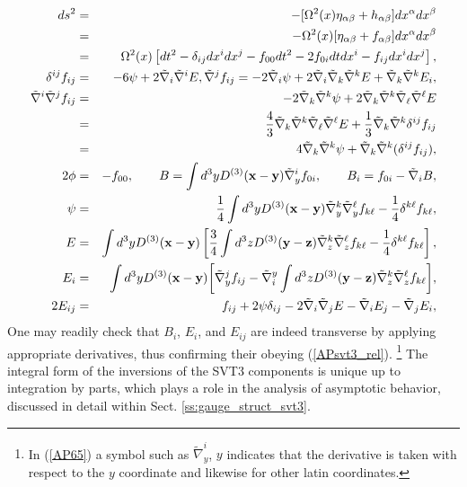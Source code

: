 \begin{eqnarray}
ds^2&=&-[\Omega^2(x)\eta_{\alpha\beta}+h_{\alpha\beta}]dx^{\alpha}dx^{\beta}
\nonumber\\
&=&-\Omega^2(x)[\eta_{\alpha\beta}+f_{\alpha\beta}]dx^{\alpha}dx^{\beta}
\nonumber\\
&=&\Omega^2(x)\left[dt^2-\delta_{ij}dx^idx^j-f_{00}dt^2-2f_{0i}dtdx^i-f_{ij}dx^idx^j\right],
\nonumber\\
\delta^{ij}f_{ij}&=&-6\psi+2\tilde{\nabla}_i\tilde{\nabla}^iE,
\tilde{\nabla}^jf_{ij}=-2\tilde{\nabla}_i\psi+2\tilde{\nabla}_i\tilde{\nabla}_k\tilde{\nabla}^kE+\tilde{\nabla}_k\tilde{\nabla}^kE_{i},
\nonumber\\
\tilde{\nabla}^i \tilde{\nabla}^jf_{ij}&=&-2\tilde{\nabla}_k\tilde{\nabla}^k\psi+2\tilde{\nabla}_k\tilde{\nabla}^k\tilde{\nabla}_{\ell}\tilde{\nabla}^{\ell}E
\nonumber\\
&=&\frac{4}{3}\tilde{\nabla}_k\tilde{\nabla}^k\tilde{\nabla}_{\ell}\tilde{\nabla}^{\ell}E+\frac{1}{3}\tilde{\nabla}_k\tilde{\nabla}^k\delta^{ij}f_{ij}
\nonumber\\
&=&4\tilde{\nabla}_k\tilde{\nabla}^k\psi+\tilde{\nabla}_k\tilde{\nabla}^k(\delta^{ij}f_{ij}),
\nonumber\\
2\phi&=&-f_{00},\qquad
B=\int d^3yD^{(3)}(\mathbf{x}-\mathbf{y})\tilde{\nabla}_y^if_{0i},\qquad B_i=f_{0i}-\tilde{\nabla}_iB,
\nonumber\\
\psi&=&\frac{1}{4}\int d^3yD^{(3)}(\mathbf{x}-\mathbf{y})\tilde{\nabla}_y^k\tilde{\nabla}_y^{\ell}f_{k\ell}-\frac{1}{4}\delta^{k\ell}f_{k\ell},
\nonumber\\
\qquad
E&=&\int d^3yD^{(3)}(\mathbf{x}-\mathbf{y})\left[\frac{3}{4}\int d^3zD^{(3)}(\mathbf{y}-\mathbf{z})\tilde{\nabla}_z^k\tilde{\nabla}_z^{\ell}f_{k\ell}-\frac{1}{4}\delta^{k\ell}f_{k\ell}\right],
\nonumber\\
E_i&=&\int d^3yD^{(3)}(\mathbf{x}-\mathbf{y})\bigg{[}\tilde{\nabla}_y^jf_{ij}
-\tilde{\nabla}^y_i\int d^3zD^{(3)}(\mathbf{y}-\mathbf{z})\tilde{\nabla}_z^k\tilde{\nabla}_z^{\ell}f_{k\ell}\bigg{]},
\nonumber\\
2E_{ij}&=&f_{ij}+2\psi\delta_{ij} -2\tilde{\nabla}_i\tilde{\nabla}_j E - \tilde{\nabla}_i E_j - \tilde{\nabla}_j E_i, 
\label{AP65}
\end{eqnarray}
%
One may readily check that $B_i$, $E_i$, and $E_{ij}$ are indeed transverse by applying appropriate derivatives, thus confirming their obeying (\ref{APsvt3_rel}).
 \footnote{In (\ref{AP65}) a symbol such as $\tilde{\nabla}_y^i$, $y$ indicates that the derivative is taken with respect to the $y$ coordinate and likewise for other latin coordinates.}
The integral form of the inversions of the SVT3 components is unique up to integration by parts, which plays a role in the analysis of asymptotic behavior, discussed in detail within Sect. \ref{ss:gauge_struct_svt3}.

